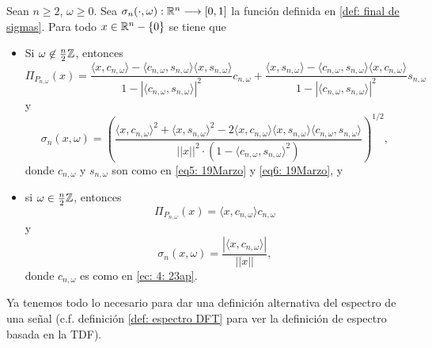 \begin{prop}
\label{prp: ammm}
Sean $n \geq 2$, $\omega \geq 0$. 
Sea $\sigma_{n}(\cdot,\omega): \mathbb{R}^{n} \longrightarrow [0,1]$
la función definida en \ref{def: final de sigmas}.
Para todo $x \in \mathbb{R}^{n}-\{ 0 \}$
se tiene que
\begin{itemize}
	\item Si $\omega \not\in \frac{n}{2} \mathbb{Z}$, entonces
	\begin{equation}
	\label{eq: pi ommm 1}
	 \Pi_{P_{n, \omega}}(x) = 
\frac{
\langle x, c_{n, \omega} \rangle - \langle c_{n, \omega}, s_{n, \omega} \rangle 
\langle x, s_{n, \omega} \rangle
}
{1-|\langle c_{n, \omega}, s_{n, \omega} \rangle |^{2}  }
c_{n, \omega} +
\frac{
\langle x, s_{n, \omega} \rangle - \langle c_{n, \omega}, s_{n, \omega} \rangle 
\langle x, c_{n, \omega} \rangle
}
{1-|\langle c_{n, \omega}, s_{n, \omega} \rangle |^{2}  }
s_{n, \omega}
	\end{equation}
	y 
	\begin{equation}
	\label{eq: coef sigma caso 1}
	\sigma_{n}(x, \omega) =
	\left(		  
		  \frac{\langle x, c_{n, \omega } \rangle^{2} +  \langle x, s_{n, \omega } \rangle^{2}	
	       -2  \langle x, c_{n, \omega } \rangle \langle x, s_{n, \omega } \rangle \langle c_{n, \omega }, s_{n, \omega } \rangle}{ || x ||^{2} \cdot
	       (1- \langle c_{n, \omega }, s_{n, \omega } \rangle^{2})}	  
\right) ^{1/2},
	\end{equation}
donde $c_{n, \omega}$ y $s_{n, \omega}$ son como en 
\eqref{eq5: 19Marzo} y \eqref{eq6: 19Marzo}, y

\item si $\omega \in \frac{n}{2} \mathbb{Z}$, entonces 
\begin{equation}
\label{eq: pi ommm 2}
\Pi_{P_{n, \omega}}(x) = \langle x, c_{n, \omega} \rangle c_{n, \omega}
\end{equation}
y 
\begin{equation}
\label{eq: sfklmslsfl}
\sigma_{n}(x, \omega) = \frac{|\langle x, c_{n, \omega} \rangle |}{||x||},
\end{equation}
donde $c_{n, \omega}$ es como en \eqref{ec: 4: 23ap}.
\end{itemize}
\end{prop}



Ya tenemos todo lo necesario para dar una definición alternativa 
del espectro de una señal 
(c.f. definición
\ref{def: espectro DFT} para ver la definición de espectro
basada en la TDF).



